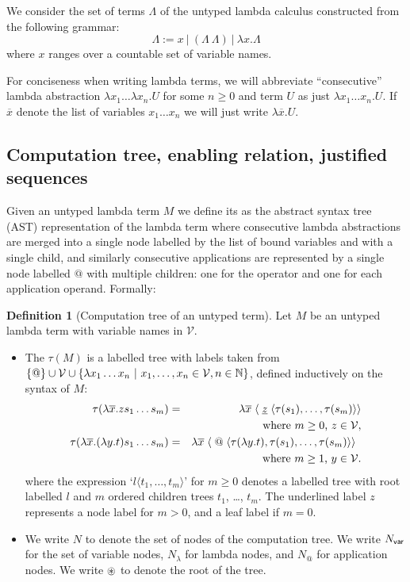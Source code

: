 \documentclass{article}
\theoremstyle{definition}
\newtheorem{definition}{Definition}[section]
\newcommand\Nodes{N}%
\newcommand\NodesVar{N_{\sf var}}%
\newcommand\NodesLmd{N_\lambda}%
\begin{document}
We consider the set of terms $\Lambda$ of the untyped lambda calculus constructed from the following grammar:
$$\Lambda := x\ |\ (\Lambda\ \Lambda)\ |\ \lambda x. \Lambda $$
where $x$ ranges over a countable set of variable names.

For conciseness when writing lambda terms, we will abbreviate ``consecutive'' lambda abstraction $\lambda x_1 \ldots \lambda x_n . U$ for some $n\geq 0$ and term $U$ as just
$\lambda x_1 \ldots x_n . U$. If $\overline{x}$ denote the list of variables $x_1 \ldots x_n$ we will just write $\lambda \overline{x} . U$.

\subsection{Computation tree, enabling relation, justified sequences}

Given an untyped lambda term $M$ we define its  as the abstract syntax tree (AST) representation of the lambda term where consecutive lambda abstractions are merged into a single node labelled by the list of bound variables and with a single child, and similarly consecutive applications are represented by a single node labelled $@$ with multiple children: one for the operator and one for each application operand. Formally:
\begin{definition}[Computation tree of an untyped term]
	Let $M$ be an untyped lambda term with variable names in $\mathcal{V}$.
\begin{itemize}
\item 
	The  $\tau(M)$ is a labelled tree with labels taken from $ \{ @ \} \cup \mathcal{V} \cup \{ \lambda x_1 \ldots x_n \ | \ x_1 ,\ldots, x_n \in
	\mathcal{V}, n\in\mathbb{N} \}$, defined inductively on the syntax of $M$:
	\begin{eqnarray*}
		\tau(\lambda \overline{x} . z s_1 \ldots s_m) &=& \lambda \overline{x}\; \langle\; \underline z\; \langle\tau(s_1),\ldots,\tau(s_m)\rangle\rangle\\
		&& \hbox {where $m\geq 0$, $z \in \mathcal{V}$}, \\
 \tau(\lambda \overline{x} . (\lambda y.t) s_1 \ldots s_m) &=& \lambda \overline{x}\; \langle\; @ \; \langle \tau(\lambda y.t),\tau(s_1),\ldots,\tau(s_m) \rangle \rangle \enspace\\
&&  \hbox{where $m\geq 1$, $y\in \mathcal{V}$}.
	\end{eqnarray*}
where the expression `$l\langle t_1, \ldots, t_m \rangle$' for $m \geq 0$ denotes a labelled tree with root labelled $l$ and $m$ ordered children trees $t_1$, \ldots, $t_m$. The underlined label $z$ represents a node label for $m>0$, and a leaf label if $m=0$.

\item We write $\Nodes$ to denote the set of nodes of the computation tree. We write $\NodesVar$ for the set of variable nodes, $\NodesLmd$ for lambda nodes, and $\Nodes_{@}$ for  application nodes.
We write $\circledast$ to denote the root of the tree.
\end{itemize}
\end{definition}
\end{document}
